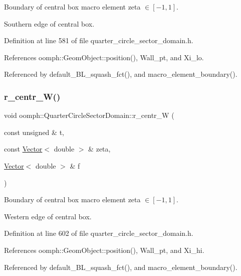 Boundary of central box macro element zeta $ \in [-1,1] $. 

Southern edge of central box. 

Definition at line 581 of file quarter\+\_\+circle\+\_\+sector\+\_\+domain.\+h.



References oomph\+::\+Geom\+Object\+::position(), Wall\+\_\+pt, and Xi\+\_\+lo.



Referenced by default\+\_\+\+B\+L\+\_\+squash\+\_\+fct(), and macro\+\_\+element\+\_\+boundary().

\mbox{\label{classoomph_1_1QuarterCircleSectorDomain_a453fc6f043f57031c1347065d521a1c3}} 
\subsubsection{\texorpdfstring{r\+\_\+centr\+\_\+\+W()}{r\_centr\_W()}}
{\footnotesize\ttfamily void oomph\+::\+Quarter\+Circle\+Sector\+Domain\+::r\+\_\+centr\+\_\+W (\begin{DoxyParamCaption}\item[{const unsigned \&}]{t,  }\item[{const \hyperlink{classoomph_1_1Vector}{Vector}$<$ double $>$ \&}]{zeta,  }\item[{\hyperlink{classoomph_1_1Vector}{Vector}$<$ double $>$ \&}]{f }\end{DoxyParamCaption})\hspace{0.3cm}{\ttfamily [private]}}



Boundary of central box macro element zeta $ \in [-1,1] $. 

Western edge of central box. 

Definition at line 602 of file quarter\+\_\+circle\+\_\+sector\+\_\+domain.\+h.



References oomph\+::\+Geom\+Object\+::position(), Wall\+\_\+pt, and Xi\+\_\+hi.



Referenced by default\+\_\+\+B\+L\+\_\+squash\+\_\+fct(), and macro\+\_\+element\+\_\+boundary().

